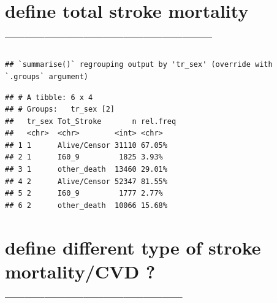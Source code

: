 \documentclass[
]{article}
\newenvironment{Shaded}{\begin{snugshade}}{\end{snugshade}}
\newcommand{\DataTypeTok}[1]{\textcolor[rgb]{0.13,0.29,0.53}{#1}}
\newcommand{\DecValTok}[1]{\textcolor[rgb]{0.00,0.00,0.81}{#1}}
\newcommand{\KeywordTok}[1]{\textcolor[rgb]{0.13,0.29,0.53}{\textbf{#1}}}
\newcommand{\NormalTok}[1]{#1}
\newcommand{\OperatorTok}[1]{\textcolor[rgb]{0.81,0.36,0.00}{\textbf{#1}}}
\newcommand{\StringTok}[1]{\textcolor[rgb]{0.31,0.60,0.02}{#1}}
\begin{document}
\hypertarget{define-total-stroke-mortality}{%
\section{define total stroke mortality
--------------------------------}\label{define-total-stroke-mortality}}

\begin{Shaded}
\end{Shaded}

\begin{verbatim}
## `summarise()` regrouping output by 'tr_sex' (override with `.groups` argument)
\end{verbatim}

\begin{verbatim}
## # A tibble: 6 x 4
## # Groups:   tr_sex [2]
##   tr_sex Tot_Stroke       n rel.freq
##   <chr>  <chr>        <int> <chr>   
## 1 1      Alive/Censor 31110 67.05%  
## 2 1      I60_9         1825 3.93%   
## 3 1      other_death  13460 29.01%  
## 4 2      Alive/Censor 52347 81.55%  
## 5 2      I60_9         1777 2.77%   
## 6 2      other_death  10066 15.68%
\end{verbatim}

\hypertarget{define-different-type-of-stroke-mortalitycvd}{%
\section{define different type of stroke mortality/CVD
?---------------------------}\label{define-different-type-of-stroke-mortalitycvd}}
\end{document}
